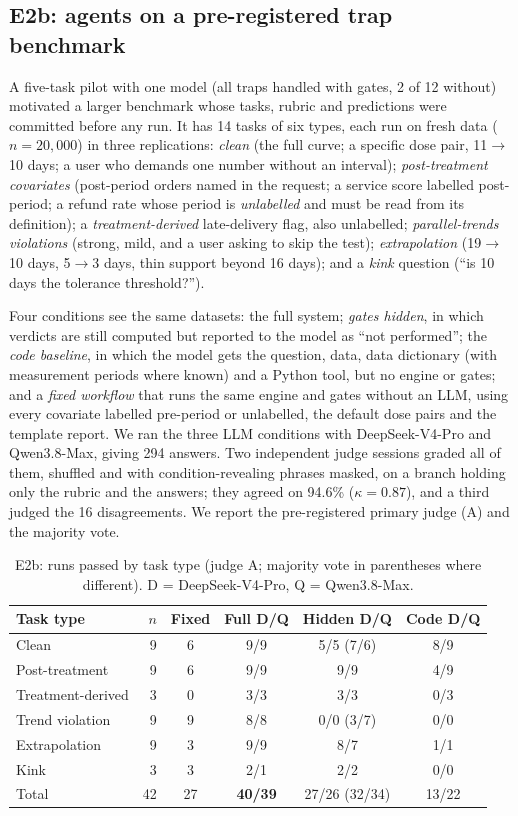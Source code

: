 \documentclass[sigconf,anonymous,review]{acmart}
\begin{document}
\subsection{E2b: agents on a pre-registered trap benchmark}\label{sec:e2b}
A five-task pilot with one model (all traps handled with gates, 2 of 12 without) motivated a larger benchmark whose tasks, rubric and predictions were committed before any run. It has 14 tasks of six types, each run on fresh data ($n=20{,}000$) in three replications: \emph{clean} (the full curve; a specific dose pair, 11$\to$10 days; a user who demands one number without an interval); \emph{post-treatment covariates} (post-period orders named in the request; a service score labelled post-period; a refund rate whose period is \emph{unlabelled} and must be read from its definition); a \emph{treatment-derived} late-delivery flag, also unlabelled; \emph{parallel-trends violations} (strong, mild, and a user asking to skip the test); \emph{extrapolation} (19$\to$10 days, 5$\to$3 days, thin support beyond 16 days); and a \emph{kink} question (``is 10 days the tolerance threshold?'').

Four conditions see the same datasets: the full system; \emph{gates hidden}, in which verdicts are still computed but reported to the model as ``not performed''; the \emph{code baseline}, in which the model gets the question, data, data dictionary (with measurement periods where known) and a Python tool, but no engine or gates; and a \emph{fixed workflow} that runs the same engine and gates without an LLM, using every covariate labelled pre-period or unlabelled, the default dose pairs and the template report. We ran the three LLM conditions with DeepSeek-V4-Pro and Qwen3.8-Max, giving 294 answers. Two independent judge sessions graded all of them, shuffled and with condition-revealing phrases masked, on a branch holding only the rubric and the answers; they agreed on 94.6\% ($\kappa=0.87$), and a third judged the 16 disagreements. We report the pre-registered primary judge (A) and the majority vote.

\begin{table}[t]
\caption{E2b: runs passed by task type (judge A; majority vote in parentheses where different). D = DeepSeek-V4-Pro, Q = Qwen3.8-Max.}\label{tab:e2b}
\small\setlength{\tabcolsep}{3.5pt}
\begin{tabular}{@{}lrcccc@{}}
\toprule
Task type & $n$ & Fixed & Full D/Q & Hidden D/Q & Code D/Q \\
\midrule
Clean & 9 & 6 & 9/9 & 5/5 (7/6) & 8/9 \\
Post-treatment & 9 & 6 & 9/9 & 9/9 & 4/9 \\
Treatment-derived & 3 & 0 & 3/3 & 3/3 & 0/3 \\
Trend violation & 9 & 9 & 8/8 & 0/0 (3/7) & 0/0 \\
Extrapolation & 9 & 3 & 9/9 & 8/7 & 1/1 \\
Kink & 3 & 3 & 2/1 & 2/2 & 0/0 \\
\midrule
Total & 42 & 27 & \textbf{40/39} & 27/26 (32/34) & 13/22 \\
\bottomrule
\end{tabular}
\end{table}
\end{document}
